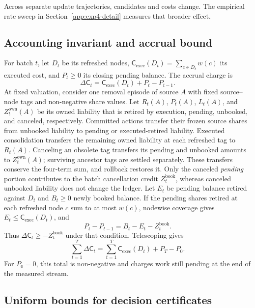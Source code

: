 Across separate update trajectories, candidates and costs change. The
empirical rate sweep in Section~\ref{app:exp4-detail} measures that broader
effect.

\subsection{Accounting invariant and accrual bound}\label{app:ledger-proof}

For batch $t$, let $D_t$ be its refreshed nodes,
$\mathsf C_{\mathrm{exec}}(D_t)=\sum_{c\in D_t}w(c)$ its executed cost,
and $P_t\ge0$ its closing pending balance. The accrual charge is
\[
\Delta\mathsf C_t=\mathsf C_{\mathrm{exec}}(D_t)+P_t-P_{t-1}.
\]
At fixed valuation, consider one removal episode of source $A$ with fixed
source--node tags and non-negative share values. Let $R_t(A)$, $P_t(A)$, $L_t(A)$, and
$Z_t^{\mathrm{own}}(A)$ be its owned liability that is retired by execution,
pending, unbooked, and canceled, respectively. Committed actions transfer their frozen source shares from unbooked liability
to pending or executed-retired liability. Executed consolidation transfers the remaining
owned liability at each refreshed tag to $R_t(A)$.
Canceling an obsolete tag transfers its pending and unbooked amounts to
$Z_t^{\mathrm{own}}(A)$; surviving ancestor tags are settled separately.
These transfers conserve the four-term sum, and rollback restores it.
Only the canceled \emph{pending} portion contributes to the batch cancellation
credit $Z_t^{\mathrm{book}}$, whereas canceled unbooked liability does not
change the ledger. Let $E_t$ be pending balance retired against $D_t$ and
$B_t\ge0$ newly booked balance. If the pending shares retired at each refreshed node $c$ sum to at most $w(c)$, nodewise coverage gives
$E_t\le\mathsf C_{\mathrm{exec}}(D_t)$, and
\[
P_t-P_{t-1}=B_t-E_t-Z_t^{\mathrm{book}}.
\]
Thus $\Delta\mathsf C_t\ge -Z_t^{\mathrm{book}}$ under that condition.
Telescoping gives
\begin{equation}\label{eq:supp-ledger}
\sum_{t=1}^{T}\Delta\mathsf C_t
=\sum_{t=1}^{T}\mathsf C_{\mathrm{exec}}(D_t)+P_T-P_0.
\end{equation}
For $P_0=0$, this total is non-negative and charges work still pending at
the end of the measured stream.

\subsection{Uniform bounds for decision certificates}\label{app:certificate-bounds}

